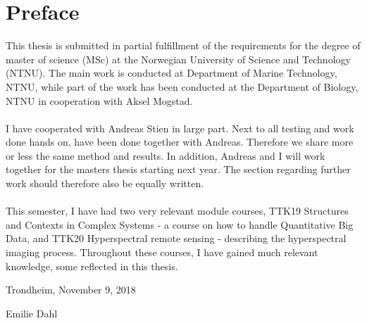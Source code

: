 \hypersetup{pageanchor=true}
%
\chapter*{Preface}
This thesis is submitted in partial fulfillment of the requirements for the degree of master of science (MSc) at the Norwegian University of Science and Technology (NTNU). The main work is conducted at Department of Marine Technology, NTNU, while part of the work has been conducted at the Department of Biology, NTNU in cooperation with Aksel Mogstad. 
\\\\
I have cooperated with Andreas Stien in large part. Next to all testing and work done hands on, have been done together with Andreas. Therefore we share more or less the same method and results. In addition, Andreas and I will work together for the masters thesis starting next year. The section regarding further work should therefore also be equally written. 
\\\\
This semester, I have had two very relevant module courses, TTK19 Structures and Contexts in Complex Systems -  a course on how to handle Quantitative Big Data, and TTK20 Hyperspectral remote sensing - describing the hyperspectral imaging process. Throughout these courses, I have gained much relevant knowledge, some reflected in this thesis.


\newline
\newline

\newline
\newline
\newline
\newline
\newline
\newline
\begin{center}
    Trondheim, November 9, 2018
    \end{center}
\begin{figure}[H]
\centering
\end{figure}
\begin{center}
Emilie Dahl
\end{center}